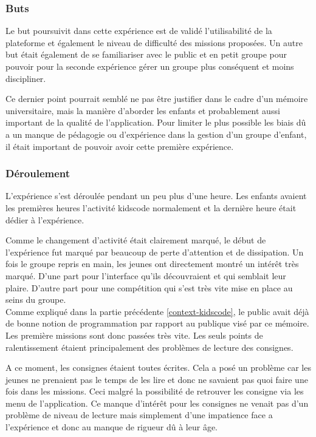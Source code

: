 \subsubsection{Buts}
Le but poursuivit dans cette expérience est de validé l'utilisabilité de la plateforme et également le niveau de difficulté des missions proposées. Un autre but était également de se familiariser avec le public et en petit groupe pour pouvoir pour la seconde expérience gérer un groupe plus conséquent et moins discipliner.

Ce dernier point pourrait semblé ne pas être justifier dans le cadre d'un mémoire universitaire, mais la manière d'aborder les enfants et probablement aussi important de la qualité de l'application. Pour limiter le plus possible les biais dû a un manque de pédagogie ou d'expérience dans la gestion d'un groupe d'enfant, il était important de pouvoir avoir cette première expérience.
\subsubsection{Déroulement}
L'expérience s'est déroulée pendant un peu plus d'une heure. Les enfants avaient les premières heures l'activité kidscode normalement et la dernière heure était dédier à l'expérience. 

Comme le changement d'activité était clairement marqué, le début de l'expérience fut marqué par beaucoup de perte d'attention et de dissipation. Un fois le groupe repris en main, les jeunes ont directement montré un intérêt très marqué. D'une part pour l'interface qu'ils découvraient et qui semblait leur plaire. D'autre part pour une compétition qui s'est très vite mise en place au seins du groupe.\\

Comme expliqué dans la partie précédente \ref{context-kidscode}, le public avait déjà de bonne notion de programmation par rapport au publique visé par ce mémoire. Les première missions sont donc passées très vite. Les seuls points de ralentissement étaient principalement des problèmes de lecture des consignes. 

A ce moment, les consignes étaient toutes écrites. Cela a posé un problème car les jeunes ne prenaient pas le temps de les lire et donc ne savaient pas quoi faire une fois dans les missions. Ceci malgré la possibilité de retrouver les consigne via les menu de l'application. Ce manque d'intérêt pour les consignes ne venait pas d'un problème de niveau de lecture mais simplement d'une impatience face a l'expérience et donc au manque de rigueur dû à leur âge.\\

